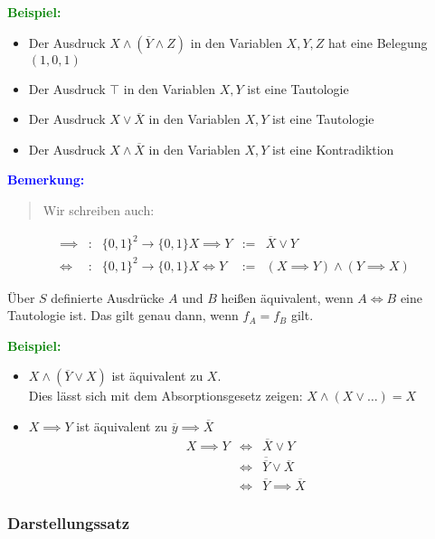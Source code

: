 \documentclass{article}
\newcommand{\blue}[1]{\textcolor{blue}{#1}}
\newcommand{\green}[1]{\textcolor{green}{#1}}
\newcommand{\ex}{\green{\textbf{Beispiel: }}}
\newcommand{\an}[1]{\blue{\textbf{Bemerkung: }}\begin{quote}#1\end{quote}}
\newcommand{\n}[1]{\overline{#1}}
\begin{document}
\ex \begin{itemize}
    \item Der Ausdruck $X \land (\n{Y} \land Z)$ in den Variablen $X,Y,Z$ hat eine Belegung $(1, 0, 1)$
    \item Der Ausdruck $\top$ in den Variablen $X, Y$ ist eine Tautologie
    \item Der Ausdruck $X \lor \n{X}$ in den Variablen $X, Y$ ist eine Tautologie
    \item Der Ausdruck $X \land \n{X}$ in den Variablen $X, Y$ ist eine Kontradiktion
\end{itemize}

\an{Wir schreiben auch:}
\begin{equation*}
    \begin{array}{lclcl}
        \implies&:& \{0, 1\}^2 \to \{0, 1\} X \implies Y &:=& \n{X} \lor Y\\
        \iff&:& \{0, 1\}^2 \to \{0, 1\} X \iff Y &:=& (X \implies Y) \land (Y \implies X)
    \end{array}
\end{equation*}

Über $S$ definierte Ausdrücke $A$ und $B$ heißen äquivalent, wenn $A \iff B$ eine Tautologie ist. Das gilt genau dann, wenn $f_A = f_B$ gilt.

\newpage\ex
\begin{itemize}
    \item $X \land (\n{Y} \lor X)$ ist äquivalent zu $X$.\\
    Dies lässt sich mit dem Absorptionsgesetz zeigen: $X \land (X \lor \dots) = X$
    \item $X \implies Y$ ist äquivalent zu $\n{y} \implies \n{X}$
    \begin{equation*}
        \begin{array}{lcl}
            X \implies Y &\iff& \n{X} \lor Y\\
            &\iff& \n{\n{Y}} \lor \n{X}\\
            &\iff& \n{Y} \implies \n{X}
        \end{array}
    \end{equation*}
\end{itemize}

\subsubsection{Darstellungssatz}
\end{document}
